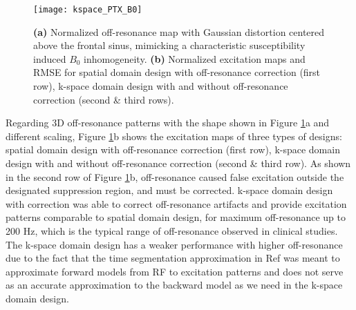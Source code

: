 \begin{figure}
	\centering
	\texttt{[image: kspace\_PTX\_B0]}
	\caption{\textbf{(a)} Normalized off-resonance map with Gaussian distortion centered above the frontal sinus, mimicking a characteristic susceptibility induced $B_0$ inhomogeneity. \textbf{(b)} Normalized excitation maps and RMSE for spatial domain design with off-resonance correction (first row), k-space domain design with and without off-resonance correction (second \& third rows).}
	\label{fig:kspace_PTX_B0}
\end{figure}

Regarding 3D off-resonance patterns with the shape shown in Figure \ref{fig:kspace_PTX_B0}a and different scaling, Figure \ref{fig:kspace_PTX_B0}b shows the excitation maps of three types of designs: spatial domain design with off-resonance correction (first row), k-space domain design with and without off-resonance correction (second \& third row). As shown in the second row of Figure \ref{fig:kspace_PTX_B0}b, off-resonance caused false excitation outside the designated suppression region, and must be corrected. k-space domain design with correction was able to correct off-resonance artifacts and provide excitation patterns comparable to spatial domain design, for maximum off-resonance up to 200 Hz, which is the typical range of off-resonance observed in clinical studies. The k-space domain design has a weaker performance with higher off-resonance due to the fact that the time segmentation approximation in Ref \cite{fessler2005toeplitz} was meant to approximate forward models from RF to excitation patterns and does not serve as an accurate approximation to the backward model as we need in the k-space domain design.